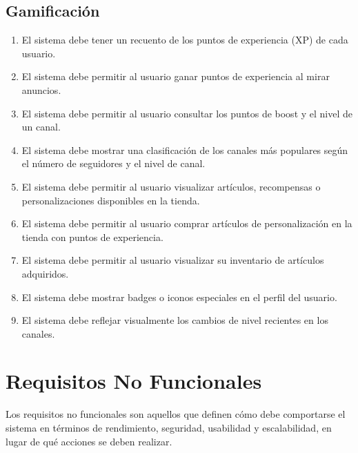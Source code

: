\subsection{Gamificación}

\begin{enumerate}[label=\textbf{RF-GAM \arabic*.}, leftmargin=*]
    \item El sistema debe tener un recuento de los puntos de experiencia (XP) de cada usuario.
    \item El sistema debe permitir al usuario ganar puntos de experiencia al mirar anuncios.
    \item El sistema debe permitir al usuario consultar los puntos de boost y el nivel de un canal.
    \item El sistema debe mostrar una clasificación de los canales más populares según el número de seguidores y el nivel de canal.
    \item El sistema debe permitir al usuario visualizar artículos, recompensas o personalizaciones disponibles en la tienda.
    \item El sistema debe permitir al usuario comprar artículos de personalización en la tienda con puntos de experiencia. 
    \item El sistema debe permitir al usuario visualizar su inventario de artículos adquiridos.
    \item El sistema debe mostrar badges o iconos especiales en el perfil del usuario.
    \item El sistema debe reflejar visualmente los cambios de nivel recientes en los canales.
\end{enumerate}

\section{Requisitos No Funcionales}

Los requisitos no funcionales son aquellos que definen cómo debe comportarse el sistema en términos de rendimiento, seguridad, usabilidad y escalabilidad, en lugar de qué acciones se deben realizar.

